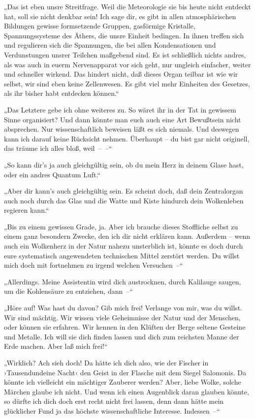„Das ist eben unsre Streitfrage. Weil die Meteorologie sie bis
heute nicht entdeckt hat, soll sie nicht denkbar sein! Ich sage
dir, es gibt in allen atmosphärischen Bildungen gewisse
formsetzende Gruppen, gasförmige Kristalle, Spannungssysteme des
Äthers, die unsre Einheit bedingen. In ihnen treffen sich und
regulieren sich die Spannungen, die bei allen Kondensationen und
Verdunstungen unsrer Teilchen maßgebend sind. Es ist schließlich
nichts andres, als was auch in euerm Nervenapparat vor sich geht,
nur ungleich einfacher, weiter und schneller wirkend. Das hindert
nicht, daß dieses Organ teilbar ist wie wir selbst, wir sind eben
keine Zellenwesen. Es gibt viel mehr Einheiten des Gesetzes, als
ihr bisher habt entdecken können.“

„Das Letztere gebe ich ohne weiteres zu. So wäret ihr in der Tat in
gewissem Sinne organisiert? Und dann könnte man euch auch eine Art
Bewußtsein nicht absprechen. Nur wissenschaftlich beweisen läßt es
sich niemals. Und deswegen kann ich darauf keine Rücksicht nehmen.
Überhaupt – du bist gar nicht originell, das träume ich alles bloß,
weil~–~–“

„So kann dir's ja auch gleichgültig sein, ob du mein Herz in deinem
Glase hast, oder ein andres Quantum Luft.“

„Aber dir kann's auch gleichgültig sein. Es scheint doch, daß dein
Zentralorgan auch noch durch das Glas und die Watte und Kiste
hindurch dein Wolkenleben regieren kann.“

„Bis zu einem gewissen Grade, ja. Aber ich brauche dieses
Stoffliche selbst zu einem ganz besondern Zwecke, den ich dir nicht
erklären kann. Außerdem – wenn auch ein Wolkenherz in der Natur
nahezu unsterblich ist, könnte es doch durch eure systematisch
angewendeten technischen Mittel zerstört werden. Du willst mich
doch mit fortnehmen zu irgend welchen Versuchen~–“

„Allerdings. Meine Assistentin wird dich austrocknen, durch
Kalilauge saugen, um die Kohlensäure zu entziehen, dann~–“

„Höre auf! Was hast du davon? Gib mich frei! Verlange von mir, was
du willst. Wir sind mächtig. Wir wissen viele Geheimnisse der Natur
und der Menschen, oder können sie erfahren. Wir kennen in den
Klüften der Berge seltene Gesteine und Metalle. Ich will sie dich
finden lassen und dich zum reichsten Manne der Erde machen. Aber
laß mich frei!“

„Wirklich? Ach sieh doch! Da hätte ich dich also, wie der Fischer
in ›Tausendundeine Nacht‹ den Geist in der Flasche mit dem Siegel
Salomonis. Da könnte ich vielleicht ein mächtiger Zauberer werden?
Aber, liebe Wolke, solche Märchen glaube ich nicht. Und wenn ich
einen Augenblick daran glauben könnte, so dürfte ich dich doch erst
recht nicht frei lassen, denn dann hätte mein glücklicher Fund ja
das höchste wissenschaftliche Interesse. Indessen~–“

